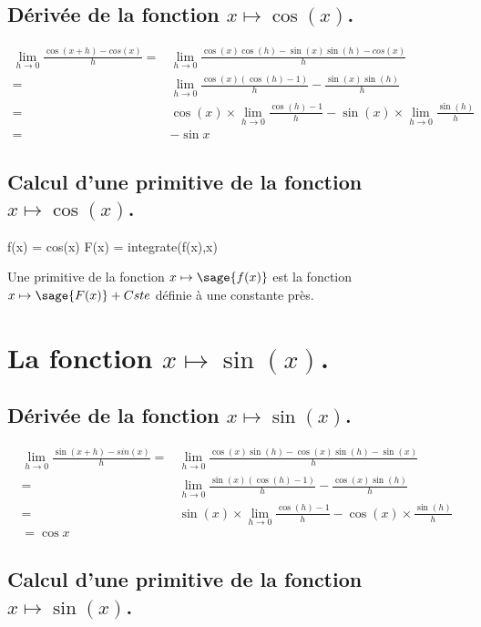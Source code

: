 \documentclass[a4paper,14pt]{extreport} %
\begin{document}
\subsection{Dérivée de la fonction $x \mapsto \cos(x)$.}

\begin{align*}
\lim_{h\to 0} \frac{\cos(x+h)-cos(x)}{h} = &\lim_{h\to 0} \frac{\cos(x)\cos(h)-\sin(x)\sin(h)-cos(x)}{h} \\ =& \lim_{h\to 0} \frac{\cos(x)(\cos(h)-1)}{h}-\frac{\sin(x)\sin(h)}{h}\\  =&  \cos(x) \times \lim_{h\to 0}\frac{\cos(h)-1}{h}- \sin(x) \times \lim_{h\to 0} \frac{\sin(h)}{h}\\  =& -\sin{x}
\end{align*}

\subsection{Calcul d'une primitive de la fonction  $x \mapsto \cos(x)$.}

\begin{sageblock}
    f(x) = cos(x)
    F(x) = integrate(f(x),x)
\end{sageblock}

Une primitive de la fonction $x \mapsto \sage{f(x)}$  est la fonction $x \mapsto \sage{F(x)} + Cste $ définie à une constante près.


\section{La fonction  $x \mapsto \sin(x)$.}


\subsection{Dérivée de la fonction $x \mapsto \sin(x)$.}

\begin{align*}
\lim_{h\to 0} \frac{\sin(x+h)-sin(x)}{h} =& \lim_{h\to 0} \frac{\cos(x)\sin(h)-\cos(x)\sin(h)-\sin(x)}{h} \\= & \lim_{h\to 0} \frac{\sin(x)(\cos(h)-1)}{h}-\frac{\cos(x)\sin(h)}{h} \\=&\sin(x) \times  \lim_{h\to 0} \frac{\cos(h)-1}{h}-\cos(x) \times \frac{\sin(h)}{h} \\= \cos{x}
\end{align*}

\subsection{Calcul d'une primitive de la fonction  $x \mapsto \sin(x)$.}
\end{document}
